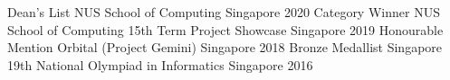



\begin{cvhonors}
  \cvhonor
  {Dean's List} %
  {NUS School of Computing} %
  {Singapore} %
  {2020} %
  \cvhonor
  {Category Winner} %
  {NUS School of Computing 15th Term Project Showcase} %
  {Singapore} %
  {2019} %
  \cvhonor
  {Honourable Mention} %
  {Orbital (Project Gemini)} %
  {Singapore} %
  {2018} %
  \cvhonor
  {Bronze Medallist} %
  {Singapore 19th National Olympiad in Informatics} %
  {Singapore} %
  {2016} %




\end{cvhonors}
